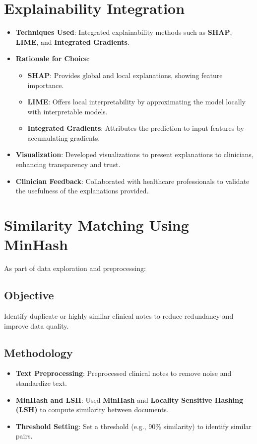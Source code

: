 \documentclass[12pt,a4paper]{report}
\begin{document}
\section{Explainability Integration}
\begin{itemize}
    \item \textbf{Techniques Used}: Integrated explainability methods such as \textbf{SHAP}, \textbf{LIME}, and \textbf{Integrated Gradients}.
    \item \textbf{Rationale for Choice}:
    \begin{itemize}
        \item \textbf{SHAP}: Provides global and local explanations, showing feature importance.
        \item \textbf{LIME}: Offers local interpretability by approximating the model locally with interpretable models.
        \item \textbf{Integrated Gradients}: Attributes the prediction to input features by accumulating gradients.
    \end{itemize}
    \item \textbf{Visualization}: Developed visualizations to present explanations to clinicians, enhancing transparency and trust.
    \item \textbf{Clinician Feedback}: Collaborated with healthcare professionals to validate the usefulness of the explanations provided.
\end{itemize}

\section{Similarity Matching Using MinHash}
As part of data exploration and preprocessing:

\subsection{Objective}
Identify duplicate or highly similar clinical notes to reduce redundancy and improve data quality.

\subsection{Methodology}
\begin{itemize}
    \item \textbf{Text Preprocessing}: Preprocessed clinical notes to remove noise and standardize text.
    \item \textbf{MinHash and LSH}: Used \textbf{MinHash} and \textbf{Locality Sensitive Hashing (LSH)} to compute similarity between documents.
    \item \textbf{Threshold Setting}: Set a threshold (e.g., 90\% similarity) to identify similar pairs.
\end{itemize}
\end{document}

